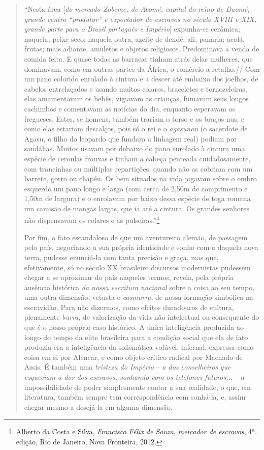 \begin{quote}
``Nesta área {[}\emph{do mercado Zobeme, de Abomé, capital do reino de
Daomé, grande centro ``produtor'' e exportador de escravos no século
XVIII e XIX, grande parte para o Brasil português e Império}{]}
expunha-se cerâmica; naquela, peixe seco; naquela outra, azeite de
dendê; ali, panaria; acolá, frutas; mais adiante, amuletos e objetos
religiosos. Predominava a venda de comida feita. E quase todas as
barracas tinham atrás delas mulheres, que dominavam, como em outras
partes da África, o comércio a retalho.// Com um pano colorido enrolado
à cintura e a descer até embaixo dos joelhos, de cabelos entrelaçados e
usando muitos colares, braceletes e tornozeleiras, elas amamentavam os
bebês, vigiavam as crianças, fumavam seus longos cachimbos e comentavam
as notícias do dia, enquanto esperavam os fregueses. Estes, se homens,
também trariam o torso e os braços nus, e como elas estariam descalços,
pois só o rei e o \emph{agasunon} (o sacerdote de Agasu, o filho do
leopardo que fundara a linhagem real) podiam por sandálias. Muitos
usavam por debaixo do pano enrolado à cintura uma espécie de ceroulas
frouxas e tinham a cabeça penteada cuidadosamente, com trancinhas ou
múltiplas repartições, quando não as cobriam com um barrete, gorro ou
chapéu. Os bem situados na vida jogavam sobre o ombro esquerdo um pano
longo e largo (com cerca de 2,50m de comprimento e 1,50m de largura) e o
enrolavam por baixo dessa espécie de toga romana um camisão de mangas
largas, que ia até a cintura. Os grandes senhores não dispensavam os
colares e as pulseiras.''\footnote{Alberto da Costa e Silva,
  \emph{Francisco Félix de Souza}, \emph{mercador de escravos}, 4ª.
  edição, Rio de Janeiro, Nova Fronteira, 2012.}

Por fim, o fato escandaloso de que um aventureiro alemão, de passagem
pelo país, negociando a sua própria identidade e sonho com o daquela
nova terra, pudesse enunciá-la com tanta precisão e graça, mas que,
efetivamente, só no século XX brasileiro discursos modernistas pudessem
chegar a se aproximar do país naqueles termos, revela, pela própria
ausência histórica \emph{da nossa escritura nacional} sobre a coisa ao
seu tempo, uma outra dimensão, vetusta e \emph{casmurra}, de nossa
formação simbólica na escravidão. Para não dizermos, como efeitos
duradouros de cultura, plenamente \emph{burra}, de valorização da vida
não intelectual ou consequente do que é o nosso próprio caso histórico.
A única inteligência produzida ao longo do tempo da elite brasileira
para a condição social que ela de fato produzia era a inteligência da
sofismática volúvel, infernal, expressa como coisa em si por Alencar, e
como objeto crítico radical por Machado de Assis. É também uma
\emph{tristeza do Império} -- \emph{a dos conselheiros que esqueciam a
dor dos escravos, sonhando com os telefones futuros...} -- a
impossibilidade de poder simplesmente contar a sua realidade, o que, em
literatura, também sempre tem correspondência com sonhá-la, e, assim
chegar mesmo a desejá-la em alguma dimensão.


\end{quote}
